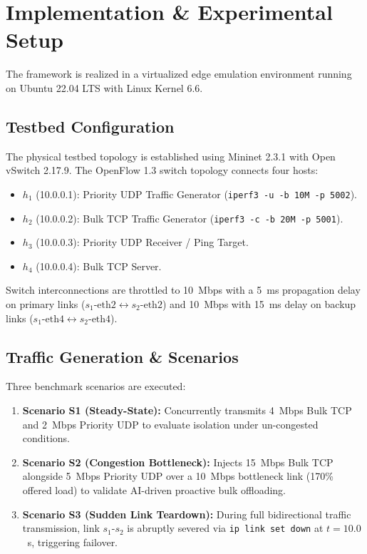 \documentclass[conference]{IEEEtran}
\begin{document}
\section{Implementation \& Experimental Setup}
The framework is realized in a virtualized edge emulation environment running on Ubuntu 22.04 LTS with Linux Kernel 6.6.

\subsection{Testbed Configuration}
The physical testbed topology is established using Mininet 2.3.1 with Open vSwitch 2.17.9. The OpenFlow 1.3 switch topology connects four hosts:
\begin{itemize}
    \item $h_1$ (10.0.0.1): Priority UDP Traffic Generator (\texttt{iperf3 -u -b 10M -p 5002}).
    \item $h_2$ (10.0.0.2): Bulk TCP Traffic Generator (\texttt{iperf3 -c -b 20M -p 5001}).
    \item $h_3$ (10.0.0.3): Priority UDP Receiver / Ping Target.
    \item $h_4$ (10.0.0.4): Bulk TCP Server.
\end{itemize}
Switch interconnections are throttled to 10~Mbps with a 5~ms propagation delay on primary links ($s_1\text{-eth2} \leftrightarrow s_2\text{-eth2}$) and 10~Mbps with 15~ms delay on backup links ($s_1\text{-eth4} \leftrightarrow s_2\text{-eth4}$).

\subsection{Traffic Generation \& Scenarios}
Three benchmark scenarios are executed:
\begin{enumerate}
    \item \textbf{Scenario S1 (Steady-State):} Concurrently transmits 4~Mbps Bulk TCP and 2~Mbps Priority UDP to evaluate isolation under un-congested conditions.
    \item \textbf{Scenario S2 (Congestion Bottleneck):} Injects 15~Mbps Bulk TCP alongside 5~Mbps Priority UDP over a 10~Mbps bottleneck link (170\% offered load) to validate AI-driven proactive bulk offloading.
    \item \textbf{Scenario S3 (Sudden Link Teardown):} During full bidirectional traffic transmission, link $s_1\text{-}s_2$ is abruptly severed via \texttt{ip link set down} at $t=10.0$~s, triggering failover.
\end{enumerate}
\end{document}
